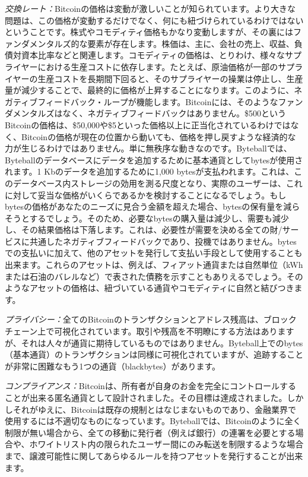 \documentclass[a4paper, dvipdfmx]{jsarticle}
\begin{document}
\emph{交換レート：}Bitcoinの価格は変動が激しいことが知られています。より大きな問題は、この価格が変動するだけでなく、何にも紐づけられているわけではないということです。株式やコモディティ価格もかなり変動しますが、その裏にはファンダメンタルズ的な要素が存在します。株価は、主に、会社の売上、収益、負債対資本比率などと関連します。コモディティの価格は、とりわけ、様々なサプライヤーにおける生産コストに依存します。たとえば、原油価格が一部のサプライヤーの生産コストを長期間下回ると、そのサプライヤーの操業は停止し、生産量が減少することで、最終的に価格が上昇することになります。このように、ネガティブフィードバック・ループが機能します。Bitcoinには、そのようなファンダメンタルズはなく、ネガティブフィードバックはありません。\$500というBitcoinの価格は、\$50,000や\$5といった価格以上に正当化されているわけではなく、Bitcoinの価格が現在の位置から動いても、価格を押し戻すような経済的な力が生じるわけではありません。単に無秩序な動きなのです。Byteballでは、Byteballのデータベースにデータを追加するために基本通貨としてbytesが使用されます。1 Kbのデータを追加するために1,000 bytesが支払われます。これは、このデータベース内ストレージの効用を測る尺度となり、実際のユーザーは、これに対して妥当な価格がいくらであるかを検討することになるでしょう。もしbytesの価格があなたのニーズに見合う金額を超えた場合、bytesの保有量を減らそうとするでしょう。そのため、必要なbytesの購入量は減少し、需要も減少し、その結果価格は下落します。これは、必要性が需要を決める全ての財/サービスに共通したネガティブフィードバックであり、投機ではありません。bytesでの支払いに加えて、他のアセットを発行して支払い手段として使用することも出来ます。これらのアセットは、例えば、フィアット通貨または自然単位（kWhまたは石油のバレルなど）で表された債務を示すこともありえるでしょう。そのようなアセットの価格は、紐づいている通貨やコモディティに自然と結びつきます。

\emph{プライバシー：}全てのBitcoinのトランザクションとアドレス残高は、ブロックチェーン上で可視化されています。取引や残高を不明瞭にする方法はありますが、それは人々が通貨に期待しているものではありません。Byteball上でのbytes（基本通貨）のトランザクションは同様に可視化されていますが、追跡することが非常に困難なもう1つの通貨（blackbytes）があります。

\emph{コンプライアンス：}Bitcoinは、所有者が自身のお金を完全にコントロールすることが出来る匿名通貨として設計されました。その目標は達成されました。しかしそれがゆえに、Bitcoinは既存の規制とはなじまないものであり、金融業界で使用するには不適切なものになっています。Byteballでは、Bitcoinのように全く制限が無い場合から、全ての移動に発行者（例えば銀行）の連署を必要とする場合や、ホワイトリスト内の限られたユーザー間にのみ転送を制限するような場合まで、譲渡可能性に関してあらゆるルールを持つアセットを発行することが出来ます。
\end{document}
